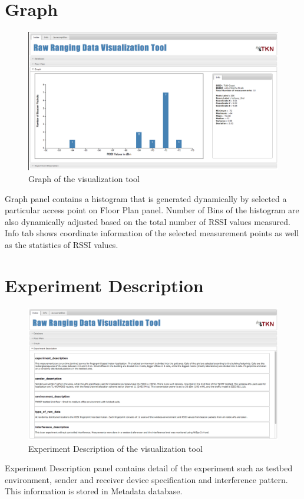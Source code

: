 \documentclass[11pt,a4paper,headinclude,footinclude,chapterprefix=on]{scrreprt}
\begin{document}
\section{Graph} 
\begin{figure}
	[!] \centering 
	\includegraphics[width=15cm]{Images/tool_graph.png} \caption{Graph of the visualization tool} \label{fig:tool:graph} 
\end{figure}
Graph panel contains a histogram that is generated dynamically by selected a particular access point on Floor Plan panel. Number of Bins of the histogram are also dynamically adjusted based on the total number of RSSI values measured. Info tab shows coordinate information of the selected measurement points as well as the statistics of RSSI values.

\section{Experiment Description} 
\begin{figure}
	[!] \centering 
	\includegraphics[width=15cm]{Images/tool_des.png} \caption{Experiment Description of the visualization tool} \label{fig:tool:des} 
\end{figure}
Experiment Description panel contains detail of the experiment such as testbed environment, sender and receiver device specification and interference pattern. This information is stored in Metadata database. 
\end{document}
